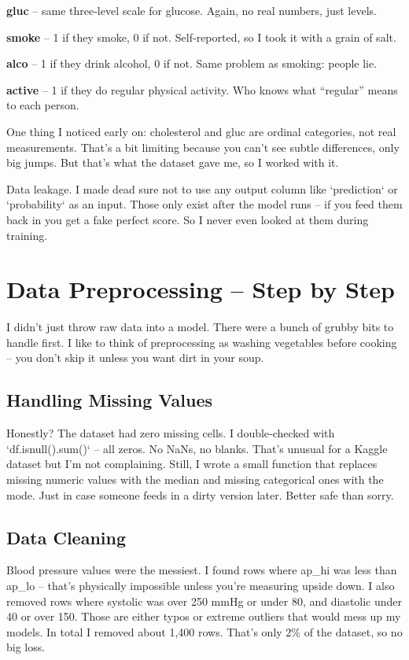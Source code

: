 \documentclass[11pt, a4paper, oneside]{book}
\begin{document}
\textbf{gluc} – same three‑level scale for glucose. Again, no real numbers, just levels.

\textbf{smoke} – 1 if they smoke, 0 if not. Self‑reported, so I took it with a grain of salt.

\textbf{alco} – 1 if they drink alcohol, 0 if not. Same problem as smoking: people lie.

\textbf{active} – 1 if they do regular physical activity. Who knows what “regular” means to each person.

One thing I noticed early on: cholesterol and gluc are ordinal categories, not real measurements. That’s a bit limiting because you can’t see subtle differences, only big jumps. But that’s what the dataset gave me, so I worked with it.

\begin{keyinsight}
Data leakage. I made dead sure not to use any output column like `prediction` or `probability` as an input. Those only exist after the model runs – if you feed them back in you get a fake perfect score. So I never even looked at them during training.
\end{keyinsight}

\section{Data Preprocessing – Step by Step}
I didn’t just throw raw data into a model. There were a bunch of grubby bits to handle first. I like to think of preprocessing as washing vegetables before cooking – you don’t skip it unless you want dirt in your soup.

\subsection{Handling Missing Values}
Honestly? The dataset had zero missing cells. I double‑checked with `df.isnull().sum()` – all zeros. No NaNs, no blanks. That’s unusual for a Kaggle dataset but I’m not complaining. Still, I wrote a small function that replaces missing numeric values with the median and missing categorical ones with the mode. Just in case someone feeds in a dirty version later. Better safe than sorry.

\subsection{Data Cleaning}
Blood pressure values were the messiest. I found rows where ap\_hi was less than ap\_lo – that’s physically impossible unless you’re measuring upside down. I also removed rows where systolic was over 250 mmHg or under 80, and diastolic under 40 or over 150. Those are either typos or extreme outliers that would mess up my models. In total I removed about 1,400 rows. That’s only 2\% of the dataset, so no big loss.
\end{document}
